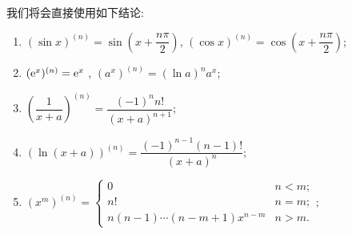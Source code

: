 我们将会直接使用如下结论:
\begin{enumerate}
    \item $(\sin x)^{(n)} = \sin(x + \dfrac{n\pi}2)$, $(\cos x)^{(n)} = \cos(x + \dfrac{n\pi}2)$;
    \item $(\mathrm{e}^x)^{(n)} = \mathrm{e}^x$ , $(a^x)^{(n)} = (\ln a)^n a^x$;
    \item $\left( \dfrac1{x+a}\right)^{(n)} = \dfrac{(-1)^n n!}{(x+a)^{n+1}}$;
    \item $\left( \ln(x+a)\right)^{(n)} = \dfrac{(-1)^{n-1}(n-1)!}{(x+a)^n}$;
    \item $(x^m)^{(n)} = \begin{cases}
                  0                          & n < m; \\
                  n!                         & n = m; \\
                  n(n-1)\cdots(n-m+1)x^{n-m} & n > m.
              \end{cases}$;
\end{enumerate}

